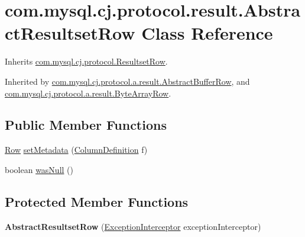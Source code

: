 \hypertarget{classcom_1_1mysql_1_1cj_1_1protocol_1_1result_1_1_abstract_resultset_row}{}\section{com.\+mysql.\+cj.\+protocol.\+result.\+Abstract\+Resultset\+Row Class Reference}
\label{classcom_1_1mysql_1_1cj_1_1protocol_1_1result_1_1_abstract_resultset_row}


Inherits \mbox{\hyperlink{interfacecom_1_1mysql_1_1cj_1_1protocol_1_1_resultset_row}{com.\+mysql.\+cj.\+protocol.\+Resultset\+Row}}.



Inherited by \mbox{\hyperlink{classcom_1_1mysql_1_1cj_1_1protocol_1_1a_1_1result_1_1_abstract_buffer_row}{com.\+mysql.\+cj.\+protocol.\+a.\+result.\+Abstract\+Buffer\+Row}}, and \mbox{\hyperlink{classcom_1_1mysql_1_1cj_1_1protocol_1_1a_1_1result_1_1_byte_array_row}{com.\+mysql.\+cj.\+protocol.\+a.\+result.\+Byte\+Array\+Row}}.

\subsection*{Public Member Functions}
\begin{DoxyCompactItemize}
\item 
\mbox{\hyperlink{interfacecom_1_1mysql_1_1cj_1_1result_1_1_row}{Row}} \mbox{\hyperlink{classcom_1_1mysql_1_1cj_1_1protocol_1_1result_1_1_abstract_resultset_row_a9f17330b25a79a752370017c78d73d08}{set\+Metadata}} (\mbox{\hyperlink{interfacecom_1_1mysql_1_1cj_1_1protocol_1_1_column_definition}{Column\+Definition}} f)
\item 
boolean \mbox{\hyperlink{classcom_1_1mysql_1_1cj_1_1protocol_1_1result_1_1_abstract_resultset_row_a9d1a54529c6a83e356e4d6bf079f8548}{was\+Null}} ()
\end{DoxyCompactItemize}
\subsection*{Protected Member Functions}
\begin{DoxyCompactItemize}
\item 
\mbox{\label{classcom_1_1mysql_1_1cj_1_1protocol_1_1result_1_1_abstract_resultset_row_a75a4e08e0b2abc8f5f1b4f2c0c59a1cc}} 
{\bfseries Abstract\+Resultset\+Row} (\mbox{\hyperlink{interfacecom_1_1mysql_1_1cj_1_1exceptions_1_1_exception_interceptor}{Exception\+Interceptor}} exception\+Interceptor)
\end{DoxyCompactItemize}
